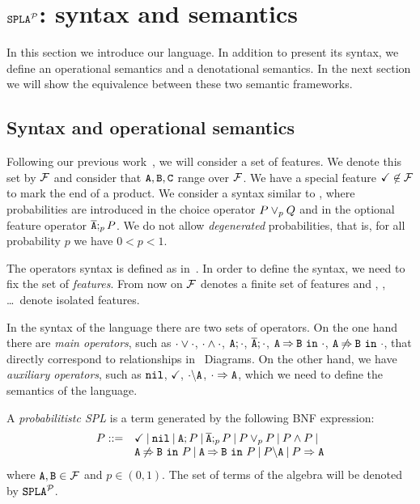 \section{$\fodaPAp$: syntax and semantics}
\label{sec:stat:sintaxMain}
In this section we introduce our language. In addition to present its syntax, we define an operational semantics and a denotational semantics. In the next section we will show the equivalence between these two semantic frameworks.


\subsection{Syntax and operational semantics}
\label{sec:stat:sintax}
Following our previous work~\cite{acl13,clc16}, we will consider a
set of features. We denote this set by $\calF$ and consider that $\feature{A}, \feature{B},
\feature{C}$ range over $\calF$. We have a special feature
$\checkmark\not\in\calF$ to mark the end  of a product. We consider a syntax similar to
\fodaPA, where probabilities are introduced in the choice operator $P \choice_{p} Q $ and in
the optional feature operator $\ofeature{A};_{p} P$. We do not allow
\emph{degenerated} probabilities, that is, for all probability $p$ we have $0< p<1$.

The operators syntax is defined as in~\cite{acl13,clc16}.
In order to define the syntax, 
we need to fix the set of \emph{features}. 
From now on $\calF$ denotes a finite set  of features
and  , , \dots\ denote isolated features.

In the syntax of the language there are two sets of operators. 
On the one hand there are \emph{main operators}, such as $\cdot\choice\cdot$, $\cdot\paral\cdot$, $\feature{A};\cdot$, $\ofeature{A};\cdot$, 
$\require{A}{B}{\cdot}$, $\exclude{A}{B}{\cdot}$,
that directly correspond to relationships in \FODA\ Diagrams.
On the other hand, we have \emph{auxiliary operators}, such as $\nil$, $\checkmark$, $\forbid{A}{\cdot}$, $\mandatory{A}{\cdot}$,
which we need to define the semantics of the language.


\bdfn
\label{sec:stat:sintax:dfn}
A \emph{probabilitistc SPL} is a term generated by the following
BNF expression:
$$
\begin{array}{ll}
P::=& \checkmark \barra \nil \barra \feature{A};P \barra
\ofeature{A};_{p} P \barra P \choice_{p} P \barra P \paral P \barra
\\
& \exclude{A}{B}{P}\barra  \require{A}{B}{P}\barra  \forbid{A}{P}\barra  \mandatory{A}{P}\\
\end{array}
$$
\noindent
where $\feature{A},\feature{B} \in \calF$ and $p\in(0,1)$. The set of terms of the
algebra will be denoted by  $\fodaPAp$.
\edfn



